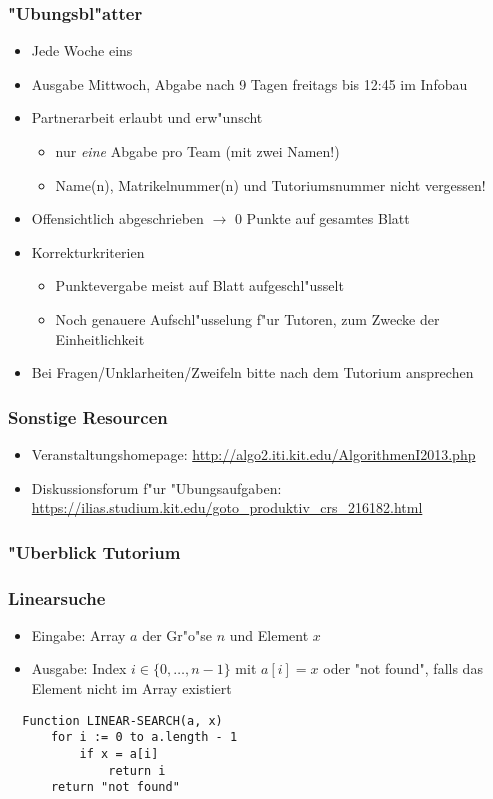 \documentclass[t]{beamer}
\begin{document}
\begin{frame}
  \frametitle{"Ubungsbl"atter}
  \begin{itemize}

  \item Jede Woche eins
  \item Ausgabe Mittwoch, Abgabe nach 9 Tagen freitags bis 12:45 im Infobau
  \item Partnerarbeit erlaubt und erw"unscht
    \begin{itemize}
    \item nur \emph{eine} Abgabe pro Team (mit zwei Namen!)
    \item Name(n), Matrikelnummer(n) und Tutoriumsnummer nicht vergessen!
    \end{itemize}
  \item Offensichtlich abgeschrieben $\rightarrow$ 0 Punkte auf gesamtes Blatt
  \item Korrekturkriterien
    \begin{itemize}
    \item Punktevergabe meist auf Blatt aufgeschl"usselt
    \item Noch genauere Aufschl"usselung f"ur Tutoren, zum Zwecke der Einheitlichkeit
    \end{itemize}
  \item Bei Fragen/Unklarheiten/Zweifeln bitte nach dem Tutorium ansprechen

  \end{itemize}
\end{frame}

\begin{frame}
  \frametitle{Sonstige Resourcen}
  \begin{itemize}
  \item Veranstaltungshomepage: \url{http://algo2.iti.kit.edu/AlgorithmenI2013.php}
  \item Diskussionsforum f"ur "Ubungsaufgaben:
     \small \url{https://ilias.studium.kit.edu/goto_produktiv_crs_216182.html}
  \end{itemize}
\end{frame}

\begin{frame}
  \frametitle{"Uberblick Tutorium}
\end{frame}

\begin{frame}[fragile]
  \frametitle{Linearsuche}
  \begin{itemize}
  \item Eingabe: Array $a$ der Gr"o"se $n$ und Element $x$
  \item Ausgabe: Index $i \in \{0,\ldots,n-1\}$ mit $a[i] = x$
                 oder "not found", falls das Element nicht im Array existiert
  \end{itemize}
  \begin{lstlisting}
  Function LINEAR-SEARCH(a, x)
      for i := 0 to a.length - 1
          if x = a[i]
              return i
      return "not found"
  \end{lstlisting}
\end{frame}
\end{document}
